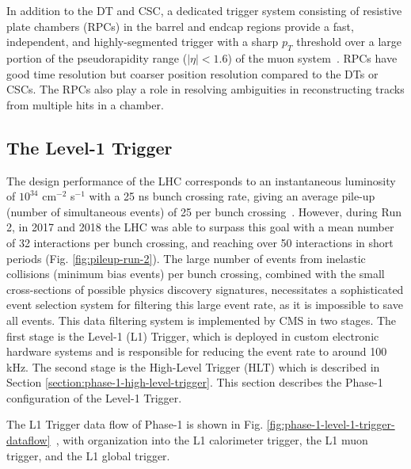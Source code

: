 In addition to the DT and CSC, a dedicated trigger system consisting of resistive plate chambers (RPCs) in the barrel and endcap regions provide a fast, independent, and highly-segmented trigger with a sharp $p_T$ threshold over a large portion of the pseudorapidity range ($|\eta| < 1.6$) of the muon system~\cite{CMS-2008-JINST-3-S08004}. RPCs have good time resolution but coarser position resolution compared to the DTs or CSCs. The RPCs also play a role in resolving ambiguities in reconstructing tracks from multiple hits in a chamber. 

\subsection{The Level-1 Trigger}
\label{section:phase-1-l1-trigger}
The design performance of the LHC corresponds to an instantaneous luminosity of $10^{34}$ cm$^{-2}$ s$^{-1}$ with a 25 ns bunch crossing rate, giving an average pile-up (number of simultaneous events) of 25 per bunch crossing~\cite{CMS-TDR-012}. However, during Run 2, in 2017 and 2018 the LHC was able to surpass this goal with a mean number of 32 interactions per bunch crossing, and reaching over 50 interactions in short periods (Fig. \ref{fig:pileup-run-2}). The large number of events from inelastic collisions (minimum bias events) per bunch crossing, combined with the small cross-sections of possible physics discovery signatures, necessitates a sophisticated event selection system for filtering this large event rate, as it is impossible to save all events. This data filtering system is implemented by CMS in two stages. The first stage is the Level-1 (L1) Trigger, which is deployed in custom electronic hardware systems and is responsible for reducing the event rate to around 100 kHz. The second stage is the High-Level Trigger (HLT) which is described in Section \ref{section:phase-1-high-level-trigger}. This section describes the Phase-1 configuration of the Level-1 Trigger.

The L1 Trigger data flow of Phase-1 is shown in Fig. \ref{fig:phase-1-level-1-trigger-dataflow}~\cite{CMS-TDR-012}, with organization into the L1 calorimeter trigger, the L1 muon trigger, and the L1 global trigger. 

